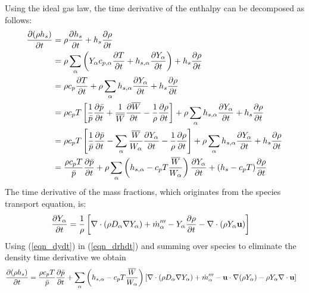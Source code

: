 Using the ideal gas law, the time derivative of the enthalpy can be decomposed as follows:
\begin{align}
\label{eqn_drhdt}
\frac{\partial (\rho h_s)}{\partial t} &= \rho \frac{\partial h_s}{\partial t} + h_s \frac{\partial \rho}{\partial t} \notag\\
&= \rho \sum_\alpha \left( Y_\alpha c_{p,\alpha} \frac{\partial T}{\partial t} + h_{s,\alpha} \frac{\partial Y_\alpha}{\partial t}\right) + h_s \frac{\partial \rho}{\partial t} \notag\\
&= \rho c_p \frac{\partial T}{\partial t} + \rho \sum_\alpha h_{s,\alpha} \frac{\partial Y_\alpha}{\partial t} + h_s \frac{\partial \rho}{\partial t} \notag\\
&= \rho c_p T \left[ \frac{1}{\bar{p}} \frac{\partial \bar{p}}{\partial t} + \frac{1}{\overline{W}} \frac{\partial \overline{W}}{\partial t} - \frac{1}{\rho} \frac{\partial \rho}{\partial t}\right] + \rho \sum_\alpha h_{s,\alpha} \frac{\partial Y_\alpha}{\partial t} + h_s \frac{\partial \rho}{\partial t} \notag\\
&= \rho c_p T \left[ \frac{1}{\bar{p}} \frac{\partial \bar{p}}{\partial t} - \sum_\alpha \frac{\overline{W}}{W_\alpha} \frac{\partial Y_\alpha}{\partial t} - \frac{1}{\rho} \frac{\partial \rho}{\partial t}\right] + \rho \sum_\alpha h_{s,\alpha} \frac{\partial Y_\alpha}{\partial t} + h_s \frac{\partial \rho}{\partial t} \notag\\
&=  \frac{\rho c_p T}{\bar{p}} \frac{\partial \bar{p}}{\partial t}  + \rho \sum_\alpha \left( h_{s,\alpha} - c_p T \frac{\overline{W}}{W_\alpha}\right)\frac{\partial Y_\alpha}{\partial t} + (h_s - c_p T) \frac{\partial \rho}{\partial t}
\end{align}
The time derivative of the mass fractions, which originates from the species transport equation, is:
\begin{align}
\label{eqn_dydt}
\frac{\partial Y_\alpha}{\partial t} &= \frac{1}{\rho} \left[ \nabla\cdot (\rho D_\alpha \nabla Y_\alpha) + \dot{m}_\alpha^{\prime\prime\prime} - Y_\alpha \frac{\partial \rho}{\partial t} - \nabla\cdot (\rho Y_\alpha \mathbf{u}) \right]
\end{align}
Using (\ref{eqn_dydt}) in (\ref{eqn_drhdt}) and summing over species to eliminate the density time derivative we obtain
\begin{align}
\label{eqn_drhdt2}
\frac{\partial (\rho h_s)}{\partial t} &= \frac{\rho c_p T}{\bar{p}} \frac{\partial \bar{p}}{\partial t}  + \sum_\alpha \left( h_{s,\alpha} - c_p T \frac{\overline{W}}{W_\alpha}\right)\left[ \nabla\cdot (\rho D_\alpha \nabla Y_\alpha) + \dot{m}_\alpha^{\prime\prime\prime} - \mathbf{u}\cdot\nabla(\rho Y_\alpha) - \rho Y_\alpha \nabla\cdot \mathbf{u} \right]
\end{align}
